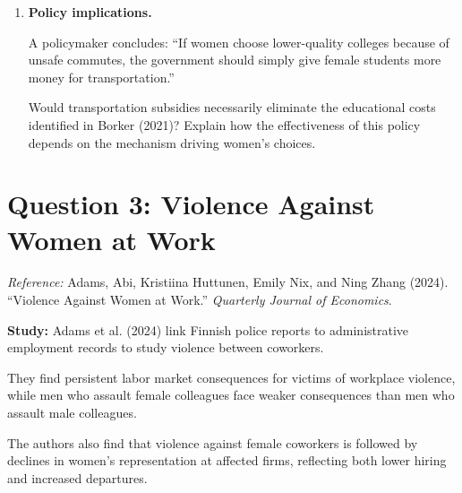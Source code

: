 \documentclass[12pt]{article}
\begin{document}
\begin{enumerate}
\begin{enumerate}
\end{enumerate}

\vspace{1cm}


\item \textbf{Policy implications.}

A policymaker concludes:
``If women choose lower-quality colleges because of
unsafe commutes, the government should simply give
female students more money for transportation.''

Would transportation subsidies necessarily eliminate
the educational costs identified in Borker (2021)?
Explain how the effectiveness of this policy depends
on the mechanism driving women's choices.

\vspace{4cm}

\end{enumerate}


\clearpage

\section*{Question 3: Violence Against Women at Work}

\noindent\textit{Reference:}
Adams, Abi, Kristiina Huttunen, Emily Nix, and Ning Zhang
(2024). ``Violence Against Women at Work.''
\emph{Quarterly Journal of Economics}.

\medskip

\noindent\textbf{Study:}
Adams et al. (2024) link Finnish police reports
to administrative employment records to study
violence between coworkers.

They find persistent labor market consequences
for victims of workplace violence, while men who
assault female colleagues face weaker consequences
than men who assault male colleagues.

The authors also find that violence against female
coworkers is followed by declines in women's
representation at affected firms, reflecting both
lower hiring and increased departures.
\end{document}
